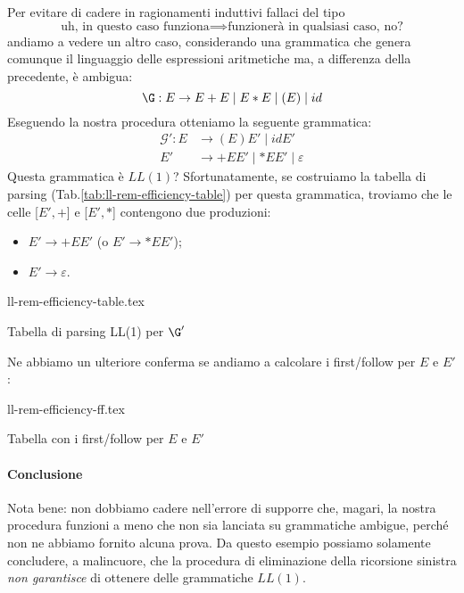 \documentclass[class=book, crop=false, oneside, 12pt]{standalone}
\begin{document}
Per evitare di cadere in ragionamenti induttivi fallaci del tipo 
\begin{equation*}
    \textrm{uh, in questo caso funziona} \implies \textrm{funzionerà in qualsiasi caso, no?}
\end{equation*}
andiamo a vedere un altro caso, considerando una grammatica che genera comunque il linguaggio delle espressioni aritmetiche ma, a differenza della precedente, è ambigua:
\begin{equation*}
    \G: E \to E + E \mid E * E \mid (E) \mid id
\end{equation*}
Eseguendo la nostra procedura otteniamo la seguente grammatica:
\begin{align*}
    \mathcal{G'}: E &\to (E)E' \mid idE' \\
    E' &\to +EE' \mid \ast EE' \mid \varepsilon
\end{align*}
Questa grammatica è \(LL(1)\)? Sfortunatamente, se costruiamo la tabella di parsing (Tab.\ref{tab:ll-rem-efficiency-table}) per questa grammatica, troviamo che le celle [\(E', +\)] e [\(E', \ast\)] contengono due produzioni:
\begin{itemize}[noitemsep]
    \item \(E' \to +EE'\) (o \(E' \to *EE'\));
    \item \(E' \to \varepsilon\).
\end{itemize}
\begin{table}
    \centering 
    {ll-rem-efficiency-table.tex}
    \caption{Tabella di parsing LL(1) per \(\G'\)}
    \label{tab:ll-rem-efficiency-table}
\end{table}
Ne abbiamo un ulteriore conferma se andiamo a calcolare i first/follow per \(E\) e \(E'\):
\begin{table}[H]
    \centering
    {ll-rem-efficiency-ff.tex}
    \caption{Tabella con i first/follow per \(E\) e \(E'\)}
    \label{ll-rem-efficiency-ff}
\end{table}
\paragraph{Conclusione}
Nota bene: non dobbiamo cadere nell'errore di supporre che, magari, la nostra procedura funzioni a meno che non sia lanciata su grammatiche ambigue, perché non ne abbiamo fornito alcuna prova. Da questo  esempio possiamo solamente concludere, a malincuore, che la procedura di eliminazione della ricorsione sinistra \emph{non garantisce} di ottenere delle grammatiche \(LL(1)\).
\end{document}
